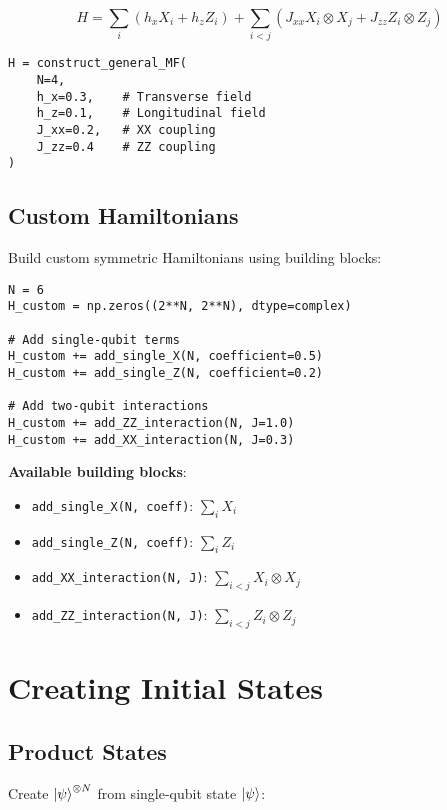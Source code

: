 \documentclass[11pt,a4paper]{article}
\begin{document}
\begin{equation}
    H = \sum_i (h_x X_i + h_z Z_i) + \sum_{i<j} (J_{xx} X_i \otimes X_j + J_{zz} Z_i \otimes Z_j)
\end{equation}

\begin{lstlisting}[caption={General model construction}]
H = construct_general_MF(
    N=4,
    h_x=0.3,    # Transverse field
    h_z=0.1,    # Longitudinal field
    J_xx=0.2,   # XX coupling
    J_zz=0.4    # ZZ coupling
)
\end{lstlisting}

\subsection{Custom Hamiltonians}

Build custom symmetric Hamiltonians using building blocks:

\begin{lstlisting}[caption={Custom Hamiltonian}]
N = 6
H_custom = np.zeros((2**N, 2**N), dtype=complex)

# Add single-qubit terms
H_custom += add_single_X(N, coefficient=0.5)
H_custom += add_single_Z(N, coefficient=0.2)

# Add two-qubit interactions
H_custom += add_ZZ_interaction(N, J=1.0)
H_custom += add_XX_interaction(N, J=0.3)
\end{lstlisting}

\textbf{Available building blocks}:
\begin{itemize}
    \item \texttt{add\_single\_X(N, coeff)}: $\sum_i X_i$
    \item \texttt{add\_single\_Z(N, coeff)}: $\sum_i Z_i$
    \item \texttt{add\_XX\_interaction(N, J)}: $\sum_{i<j} X_i \otimes X_j$
    \item \texttt{add\_ZZ\_interaction(N, J)}: $\sum_{i<j} Z_i \otimes Z_j$
\end{itemize}

\section{Creating Initial States}

\subsection{Product States}

Create $\ket{\psi}^{\otimes N}$ from single-qubit state $\ket{\psi}$:
\end{document}
